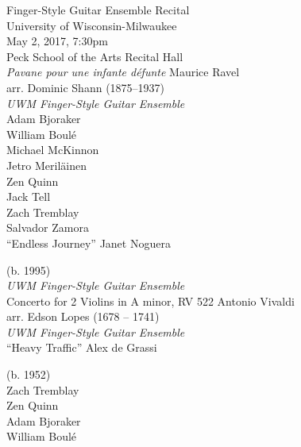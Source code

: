 \documentclass[12pt]{article}
\begin{document}
\begin{center}
  Finger-Style Guitar Ensemble Recital\\
  University of Wisconsin-Milwaukee\\
  May 2, 2017, 7:30pm\\
  Peck School of the Arts Recital Hall\\
\vspace{.15in}
\emph{Pavane pour une infante défunte} \dotfill Maurice Ravel\\
\hspace{.15in} arr. Dominic Shann \hfill (1875–1937)\\
\emph{UWM Finger-Style Guitar Ensemble}\\
Adam Bjoraker\\
William Boulé\\
Michael McKinnon\\
Jetro Meriläinen\\
Zen Quinn\\
Jack Tell\\
Zach Tremblay\\
Salvador Zamora\\
\vspace{.15in}
``Endless Journey'' \dotfill Janet Noguera\\
\strut \hfill (b. 1995)\\
\emph{UWM Finger-Style Guitar Ensemble}\\
\vspace{.15in}
Concerto for 2 Violins in A minor, RV 522 \dotfill Antonio Vivaldi\\
\hspace{.15in} arr. Edson Lopes \hfill (1678 -- 1741)\\
\emph{UWM Finger-Style Guitar Ensemble}\\
\vspace{.15in}
``Heavy Traffic'' \dotfill Alex de Grassi\\
\strut \hfill (b. 1952)\\
Zach Tremblay\\
Zen Quinn\\
Adam Bjoraker\\
William Boulé\\
\end{center}
\end{document}
